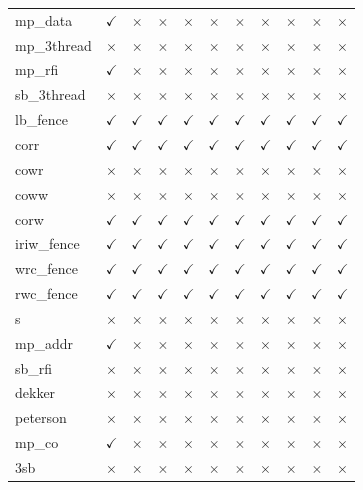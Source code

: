 \documentclass[11pt]{article}
\newcommand{\cmark}{$\checkmark$}
\newcommand{\xmark}{$\times$}
\begin{document}
{\begin{longtable}{l cccc cccccc}
mp\_data & \cmark & \xmark & \xmark & \xmark & \xmark & \xmark & \xmark & \xmark & \xmark & \xmark \\
mp\_3thread & \xmark & \xmark & \xmark & \xmark & \xmark & \xmark & \xmark & \xmark & \xmark & \xmark \\
mp\_rfi & \cmark & \xmark & \xmark & \xmark & \xmark & \xmark & \xmark & \xmark & \xmark & \xmark \\
sb\_3thread & \xmark & \xmark & \xmark & \xmark & \xmark & \xmark & \xmark & \xmark & \xmark & \xmark \\
lb\_fence & \cmark & \cmark & \cmark & \cmark & \cmark & \cmark & \cmark & \cmark & \cmark & \cmark \\
corr & \cmark & \cmark & \cmark & \cmark & \cmark & \cmark & \cmark & \cmark & \cmark & \cmark \\
cowr & \xmark & \xmark & \xmark & \xmark & \xmark & \xmark & \xmark & \xmark & \xmark & \xmark \\
coww & \xmark & \xmark & \xmark & \xmark & \xmark & \xmark & \xmark & \xmark & \xmark & \xmark \\
corw & \cmark & \cmark & \cmark & \cmark & \cmark & \cmark & \cmark & \cmark & \cmark & \cmark \\
iriw\_fence & \cmark & \cmark & \cmark & \cmark & \cmark & \cmark & \cmark & \cmark & \cmark & \cmark \\
wrc\_fence & \cmark & \cmark & \cmark & \cmark & \cmark & \cmark & \cmark & \cmark & \cmark & \cmark \\
rwc\_fence & \cmark & \cmark & \cmark & \cmark & \cmark & \cmark & \cmark & \cmark & \cmark & \cmark \\
s & \xmark & \xmark & \xmark & \xmark & \xmark & \xmark & \xmark & \xmark & \xmark & \xmark \\
mp\_addr & \cmark & \xmark & \xmark & \xmark & \xmark & \xmark & \xmark & \xmark & \xmark & \xmark \\
sb\_rfi & \xmark & \xmark & \xmark & \xmark & \xmark & \xmark & \xmark & \xmark & \xmark & \xmark \\
dekker & \xmark & \xmark & \xmark & \xmark & \xmark & \xmark & \xmark & \xmark & \xmark & \xmark \\
peterson & \xmark & \xmark & \xmark & \xmark & \xmark & \xmark & \xmark & \xmark & \xmark & \xmark \\
mp\_co & \cmark & \xmark & \xmark & \xmark & \xmark & \xmark & \xmark & \xmark & \xmark & \xmark \\
3sb & \xmark & \xmark & \xmark & \xmark & \xmark & \xmark & \xmark & \xmark & \xmark & \xmark \\

\end{longtable}}
\end{document}
